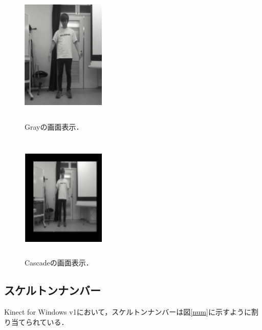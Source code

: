 \begin{figure}[p]
    \begin{minipage}{0.5\hsize}
     \begin{center}
      \includegraphics[width=4cm,height=6cm]{image/gray.png}
     \end{center}
     \caption[Grayの画面表示]{Grayの画面表示．}
     \label{gray}
    \end{minipage}
    \begin{minipage}{0.5\hsize}
     \begin{center}
      \includegraphics[width=4cm,height=6cm]{image/cascade.png}
     \end{center}
     \caption[Cascadeの画面表示]{Cascadeの画面表示．}
     \label{cascade}
    \end{minipage}
\end{figure}

\clearpage

\subsection{スケルトンナンバー}
Kinect for Windows v1において，スケルトンナンバーは図\ref{num}に示すように割り当てられている．

